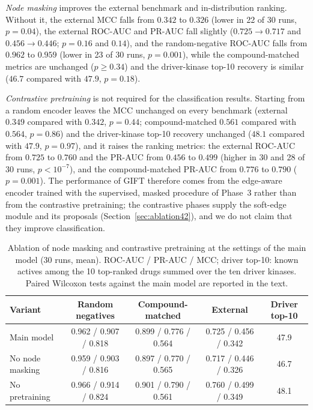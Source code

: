 \documentclass[11pt,letterpaper]{article}
\begin{document}
\emph{Node masking} improves the external benchmark and in-distribution ranking. Without it, the external MCC falls from $0.342$ to $0.326$ (lower in 22 of 30 runs, $p=0.04$), the external ROC-AUC and PR-AUC fall slightly ($0.725\to0.717$ and $0.456\to0.446$; $p=0.16$ and $0.14$), and the random-negative ROC-AUC falls from $0.962$ to $0.959$ (lower in 23 of 30 runs, $p=0.001$), while the compound-matched metrics are unchanged ($p\geq0.34$) and the driver-kinase top-10 recovery is similar ($46.7$ compared with $47.9$, $p=0.18$).

\emph{Contrastive pretraining} is not required for the classification results. Starting from a random encoder leaves the MCC unchanged on every benchmark (external $0.349$ compared with $0.342$, $p=0.44$; compound-matched $0.561$ compared with $0.564$, $p=0.86$) and the driver-kinase top-10 recovery unchanged ($48.1$ compared with $47.9$, $p=0.97$), and it raises the ranking metrics: the external ROC-AUC from $0.725$ to $0.760$ and the PR-AUC from $0.456$ to $0.499$ (higher in 30 and 28 of 30 runs, $p<10^{-7}$), and the compound-matched PR-AUC from $0.776$ to $0.790$ ($p=0.001$). The performance of GIFT therefore comes from the edge-aware encoder trained with the supervised, masked procedure of Phase~3 rather than from the contrastive pretraining; the contrastive phases supply the soft-edge module and its proposals (Section~\ref{sec:ablation42}), and we do not claim that they improve classification.

\begin{table}[!t]
\centering
\caption{Ablation of node masking and contrastive pretraining at the settings of the main model (30 runs, mean). ROC-AUC / PR-AUC / MCC; driver top-10: known actives among the 10 top-ranked drugs summed over the ten driver kinases. Paired Wilcoxon tests against the main model are reported in the text.}
\label{tab:ablation_phases}
\small
\setlength{\tabcolsep}{4pt}
\begin{tabular}{lcccc}
\toprule
\textbf{Variant} & \textbf{Random negatives} & \textbf{Compound-matched} & \textbf{External} & \textbf{Driver top-10} \\
\midrule
Main model & 0.962 / 0.907 / 0.818 & 0.899 / 0.776 / 0.564 & 0.725 / 0.456 / 0.342 & 47.9 \\
No node masking & 0.959 / 0.903 / 0.816 & 0.897 / 0.770 / 0.565 & 0.717 / 0.446 / 0.326 & 46.7 \\
No pretraining & 0.966 / 0.914 / 0.824 & 0.901 / 0.790 / 0.561 & 0.760 / 0.499 / 0.349 & 48.1 \\
\bottomrule
\end{tabular}
\end{table}
\end{document}
